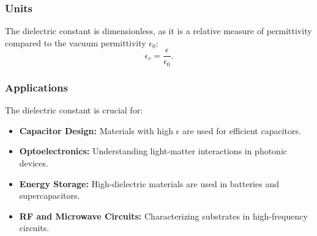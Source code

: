 \documentclass[12pt]{article}
\begin{document}
\subsubsection*{Units}
The dielectric constant is dimensionless, as it is a relative measure of permittivity compared to the vacuum permittivity $\epsilon_0$:
\[
\epsilon_r = \frac{\epsilon}{\epsilon_0}.
\]

\subsubsection*{Applications}
The dielectric constant is crucial for:
\begin{itemize}
    \item \textbf{Capacitor Design:} Materials with high $\epsilon$ are used for efficient capacitors.
    \item \textbf{Optoelectronics:} Understanding light-matter interactions in photonic devices.
    \item \textbf{Energy Storage:} High-dielectric materials are used in batteries and supercapacitors.
    \item \textbf{RF and Microwave Circuits:} Characterizing substrates in high-frequency circuits.
\end{itemize}
\end{document}
